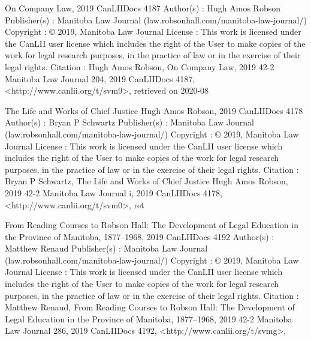 On Company Law, 2019 CanLIIDocs 4187
Author(s) : 	Hugh Amos Robson
Publisher(s) : 	Manitoba Law Journal (law.robsonhall.com/manitoba-law-journal/)
Copyright : 	© 2019, Manitoba Law Journal
License : 	This work is licensed under the CanLII user license which includes the right of the User to make copies of the work for legal research purposes, in the practice of law or in the exercise of their legal rights.
Citation : 	Hugh Amos Robson, On Company Law, 2019 42-2 Manitoba Law Journal 204, 2019 CanLIIDocs 4187, <http://www.canlii.org/t/svm9>, retrieved on 2020-08


The Life and Works of Chief Justice Hugh Amos Robson, 2019 CanLIIDocs 4178
Author(s) : 	Bryan P Schwartz
Publisher(s) : 	Manitoba Law Journal (law.robsonhall.com/manitoba-law-journal/)
Copyright : 	© 2019, Manitoba Law Journal
License : 	This work is licensed under the CanLII user license which includes the right of the User to make copies of the work for legal research purposes, in the practice of law or in the exercise of their legal rights.
Citation : 	Bryan P Schwartz, The Life and Works of Chief Justice Hugh Amos Robson, 2019 42-2 Manitoba Law Journal i, 2019 CanLIIDocs 4178, <http://www.canlii.org/t/svm0>, ret


From Reading Courses to Robson Hall: The Development of Legal Education in the Province of Manitoba, 1877–1968, 2019 CanLIIDocs 4192
Author(s) : 	Matthew Renaud
Publisher(s) : 	Manitoba Law Journal (law.robsonhall.com/manitoba-law-journal/)
Copyright : 	© 2019, Manitoba Law Journal
License : 	This work is licensed under the CanLII user license which includes the right of the User to make copies of the work for legal research purposes, in the practice of law or in the exercise of their legal rights.
Citation : 	Matthew Renaud, From Reading Courses to Robson Hall: The Development of Legal Education in the Province of Manitoba, 1877–1968, 2019 42-2 Manitoba Law Journal 286, 2019 CanLIIDocs 4192, <http://www.canlii.org/t/svmg>,




%
%
%
%

